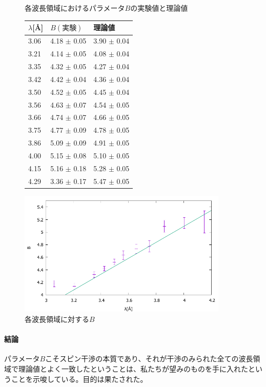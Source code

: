 \begin{figure}[h]
\begin{minipage}{0.35\hsize}
\centering
\makeatletter
\def\@captype{table}
\makeatother
\caption{各波長領域におけるパラメータ$B$の実験値と理論値} \label{analysis_tbl_B}
\begin{tabular}{lll}
$\lambda$[\AA] &  $B(実験)$ &   理論値 \\ \hline
3.06  & 4.18  $\pm$ 0.05  & 3.90  $\pm$ 0.04  \\
3.21  & 4.14  $\pm$ 0.05  & 4.08  $\pm$ 0.04  \\
3.35  & 4.32  $\pm$ 0.05  & 4.27  $\pm$ 0.04  \\
3.42  & 4.42  $\pm$ 0.04  & 4.36  $\pm$ 0.04  \\
3.50  & 4.52  $\pm$ 0.05  & 4.45  $\pm$ 0.04  \\
3.56  & 4.63  $\pm$ 0.07  & 4.54  $\pm$ 0.05  \\
3.66  & 4.74  $\pm$ 0.07  & 4.66  $\pm$ 0.05  \\
3.75  & 4.77  $\pm$ 0.09  & 4.78  $\pm$ 0.05  \\
3.86  & 5.09  $\pm$ 0.09  & 4.91  $\pm$ 0.05  \\
4.00  & 5.15  $\pm$ 0.08  & 5.10  $\pm$ 0.05  \\
4.15  & 5.16  $\pm$ 0.18  & 5.28  $\pm$ 0.05  \\
4.29  & 3.36  $\pm$ 0.17  & 5.47  $\pm$ 0.05  \\ \hline
\end{tabular}
\end{minipage}
\begin{minipage}{0.65\hsize}
\centering
\vspace{2.5cm}
\includegraphics[width=10cm]{analysis/B/B_F.pdf}
\caption{各波長領域に対する$B$} \label{analysis_fig_B}
\end{minipage}
\end{figure}

\paragraph{結論}
パラメータ$B$こそスピン干渉の本質であり、それが干渉のみられた全ての波長領域で理論値とよく一致したということは、私たちが望みのものを手に入れたということを示唆している。目的は果たされた。

